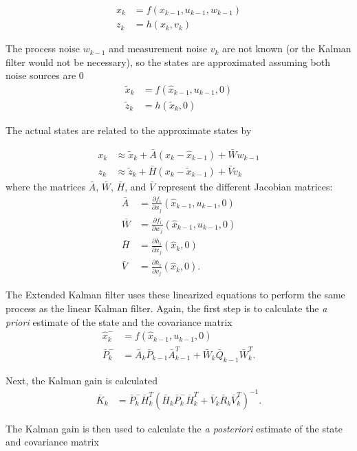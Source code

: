 \begin{align}
x_k &= f(x_{k-1},u_{k-1},w_{k-1})\\
z_k &= h(x_k,v_k)
\end{align}

The process noise $w_{k-1}$ and measurement noise $v_k$ are not known (or the Kalman filter would not be necessary), so the states are approximated assuming both noise sources are 0
\begin{align}
\tilde{x}_k &= f(\hat{x}_{k-1},u_{k-1},0)\\
\tilde{z}_k &= h(\tilde{x}_k,0)
\end{align}

The actual states are related to the approximate states by

\begin{align}
x_k &\approx\tilde{x}_k+\bar{A}(x_k-\hat{x}_{k-1})+\bar{W}w_{k-1}\\
z_k &\approx\tilde{z}_k+\bar{H}(x_k-\tilde{x}_{k-1})+\bar{V}v_k
\end{align}
\noindent
where  the matrices $\bar{A}$, $\bar{W}$, $\bar{H}$, and $\bar{V}$ represent the different Jacobian matrices:
\begin{align}
\bar{A} &= \frac{\partial f_i}{\partial x_j}(\hat{x}_{k-1},u_{k-1},0)\\
\bar{W} &= \frac{\partial f_i}{\partial w_j}(\hat{x}_{k-1},u_{k-1},0)\\
\bar{H} &= \frac{\partial h_i}{\partial x_j}(\hat{x}_{k},0)\\
\bar{V} &= \frac{\partial h_i}{\partial v_j}(\hat{x}_{k},0).
\end{align}

The Extended Kalman filter uses these linearized equations to perform the same process as the linear Kalman filter. Again, the first step is to calculate the \textit{a priori} estimate of the state and the covariance matrix
\begin{align}
\hat{x}^-_k &=f(\hat{x}_{k-1},u_{k-1},0)\\
\bar{P}^-_k  &= \bar{A}_k\bar{P}_{k-1}\bar{A}^T_{k-1}+\bar{W}_k\bar{Q}_{k-1}\bar{W}^T_k.
\end{align}

Next, the Kalman gain is calculated
\begin{align}
\bar{K}_k &=\bar{P}^-_k\bar{H}^T_k(\bar{H}_k\bar{P}^-_k\bar{H}^T_k+\bar{V}_k\bar{R}_k\bar{V}^T_k)^{-1}.
\end{align}

The Kalman gain is then used to calculate the \textit{a posteriori} estimate of the state and covariance matrix

